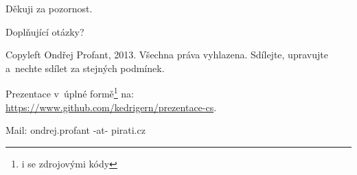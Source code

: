 \documentclass[xetex]{beamer}
\begin{document}
\begin{frame}

	Děkuji za pozornost.

	\bigskip
	
	Doplňující otázky?

	\bigskip

	\bigskip

	\scriptsize
	Copyleft Ondřej Profant, 2013. Všechna práva vyhlazena. Sdílejte, upravujte a~nechte sdílet za stejných podmínek. 

	\bigskip

	Prezentace v~úplné formě\footnote{i se zdrojovými kódy} na:\\ 
	\url{https://www.github.com/kedrigern/prezentace-cs}.

	\bigskip

	Mail: ondrej.profant -at- pirati.cz 
\end{frame}
\end{document}
